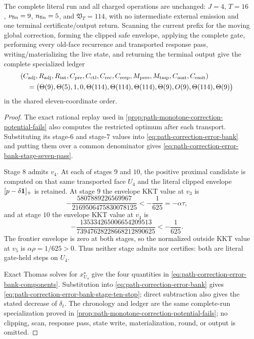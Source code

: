 \begin{proposition}
The complete literal run and all charged operations are unchanged:
$J=4$, $T=16$, $\nu_{\rm fin}=9$, $n_{\rm fin}=5$, and
$\mathfrak V_T=114$, with no intermediate external emission and one terminal
certificate/output return.  Scanning the current prefix for the moving
global correction, forming the clipped safe envelope, applying the complete
gate, performing every old-face recurrence and transported response pass,
writing/materializing the live state, and returning the terminal output give
the complete specialized ledger
\begin{equation}
 \begin{aligned}
 &(C_{\rm adj},R_{\rm adj},R_{\rm int},C_{\rm pre},C_{\rm ctl},C_{\rm rec},
 C_{\rm resp},M_{\rm pers},M_{\rm tmp},C_{\rm mat},C_{\rm emit})\\
 &\quad=\bigl(\Theta(9),\Theta(5),1,0,
       \Theta(114),\Theta(114),\Theta(114),
       \Theta(9),O(9),\Theta(114),\Theta(9)\bigr)
 \end{aligned}
 \label{eq:path-correction-error-bank-stop-eleven-vector}
\end{equation}
in the shared eleven-coordinate order.
\end{proposition}

\begin{proof}
The exact rational replay used in
\cref{prop:path-monotone-correction-potential-fails} also computes the
restricted optimum after each transport.  Substituting its stage-$6$ and
stage-$7$ values into \cref{eq:path-correction-error-bank} and putting them
over a common denominator gives
\cref{eq:path-correction-error-bank-stage-seven-pass}.

Stage $8$ admits $v_4$.  At each of stages $9$ and $10$, the positive
proximal candidate is computed on that same transported face $U_4$ and the
literal clipped envelope $[p-\delta\mathbf{1}]_+$ is retained.  At stage $9$ the
envelope KKT value at $v_3$ is
\begin{equation*}
 -\frac{5807889226569967}{2169506475830078125}
 <-\frac1{625}=-\alpha\tau,
\end{equation*}
and at stage $10$ the envelope KKT value at $v_4$ is
\begin{equation*}
 -\frac{135334265006654209513}{73947628228668212890625}
 <-\frac1{625}.
\end{equation*}
The frontier envelope is zero at both stages, so the normalized outside KKT
value at $v_5$ is $\alpha\rho=1/625>0$.  Thus neither stage admits nor
certifies: both are literal gate-held steps on $U_4$.

Exact Thomas solves for $x_{U_4}^\star$ give the four quantities in
\cref{eq:path-correction-error-bank-components}.  Substitution into
\cref{eq:path-correction-error-bank} gives
\cref{eq:path-correction-error-bank-stage-ten-stop}; direct subtraction also
gives the stated decrease of $\delta_t$.  The chronology and ledger are the
same complete-run specialization proved in
\cref{prop:path-monotone-correction-potential-fails}; no clipping, scan,
response pass, state write, materialization, round, or output is omitted.
\end{proof}

